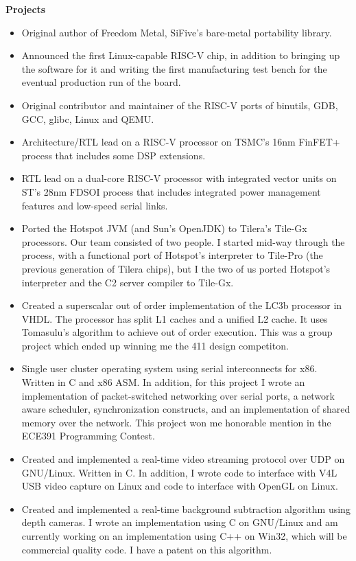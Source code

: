 \documentclass{letter}
\begin{document}
\textbf{Projects}
\begin{itemize}
\item Original author of Freedom Metal, SiFive's bare-metal portability library.
\item Announced the first Linux-capable RISC-V chip, in addition to bringing up
  the software for it and writing the first manufacturing test bench for the
  eventual production run of the board.
\item Original contributor and maintainer of the RISC-V ports of binutils, GDB,
  GCC, glibc, Linux and QEMU. 
\item Architecture/RTL lead on a RISC-V processor on TSMC's 16nm FinFET+
  process that includes some DSP extensions.
\item RTL lead on a dual-core RISC-V processor with integrated vector units on
  ST's 28nm FDSOI process that includes integrated power management features
  and low-speed serial links.
\item Ported the Hotspot JVM (and Sun's OpenJDK) to Tilera's Tile-Gx
  processors.  Our team consisted of two people.  I started mid-way
  through the process, with a functional port of Hotspot's interpreter
  to Tile-Pro (the previous generation of Tilera chips), but I the two
  of us ported Hotspot's interpreter and the C2 server compiler to
  Tile-Gx.
\item Created a superscalar out of order implementation of the LC3b
  processor in VHDL.  The processor has split L1 caches and a unified
  L2 cache.  It uses Tomasulu's algorithm to achieve out of order
  execution.  This was a group project which ended up winning me the
  411 design competiton.
\item Single user cluster operating system using serial interconnects
  for x86.  Written in C and x86 ASM.  In addition, for this project I
  wrote an implementation of packet-switched networking over serial
  ports, a network aware scheduler, synchronization constructs, and an
  implementation of shared memory over the network.  This project won
  me honorable mention in the ECE391 Programming Contest.
\item Created and implemented a real-time video streaming protocol
  over UDP on GNU/Linux.  Written in C.  In addition, I wrote code to
  interface with V4L USB video capture on Linux and code to interface
  with OpenGL on Linux.
\item Created and implemented a real-time background subtraction
  algorithm using depth cameras.  I wrote an implementation using C on
  GNU/Linux and am currently working on an implementation using C++ on
  Win32, which will be commercial quality code.  I have a patent on
  this algorithm.
\end{itemize}
\end{document}
